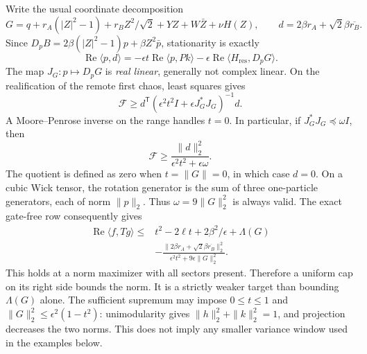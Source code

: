 Write the usual coordinate decomposition
\[
 G=q+r_A(|Z|^2-1)+r_BZ^2/\sqrt2+YZ+W\bar Z+\nu H(Z),
 \qquad d=2\beta r_A+\sqrt2\beta\overline{r_B}.
\]
Since $D_pB=2\beta(|Z|^2-1)p+\beta Z^2\bar p$, stationarity is exactly
\[
 \operatorname{Re}\langle p,d\rangle
 =-\epsilon t\operatorname{Re}\langle p,Pk\rangle
  -\epsilon\operatorname{Re}\langle H_{\mathrm{res}},D_pG\rangle.
\]
The map $J_G:p\mapsto D_pG$ is \emph{real linear}, generally not complex
linear. On the realification of the remote first chaos, least squares gives
\[
 \mathcal F\ge
 d^{\mathsf T}(\epsilon^2t^2I+\epsilon J_G^*J_G)^{-1}d.
\]
A Moore--Penrose inverse on the range handles $t=0$. In particular, if
$J_G^*J_G\preceq\omega I$, then
\[
 \mathcal F\ge\frac{\|d\|_2^2}{\epsilon^2t^2+\epsilon\omega}.
\]
The quotient is defined as zero when $t=\|G\|=0$, in which case $d=0$.
On a cubic Wick tensor, the rotation generator is the sum of three
one-particle generators, each of norm $\|p\|_2$. Thus
$\omega=9\|G\|_2^2$ is always valid. The exact gate-free row consequently gives
\[
\boxed{\begin{aligned}
 \operatorname{Re}\langle f,Tg\rangle\le{}&
 t^2-2\ell t+2\beta^2/\epsilon+\Lambda(G)\\[-2pt]
 &-\frac{\|2\beta r_A+\sqrt2\beta\overline{r_B}\|_2^2}
 {\epsilon^2t^2+9\epsilon\|G\|_2^2}.
\end{aligned}}
\]
This holds at a norm maximizer with all sectors present. Therefore a uniform
cap on its right side bounds the norm. It is a strictly weaker target than
bounding $\Lambda(G)$ alone.
The sufficient supremum may impose $0\le t\le1$ and
$\|G\|_2^2\le\epsilon^2(1-t^2)$: unimodularity gives
$\|h\|_2^2+\|k\|_2^2=1$, and projection decreases the two norms.
This does not imply any smaller variance window used in the examples below.

